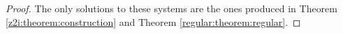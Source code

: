 \begin{proof}
    The only solutions to these systems are the ones produced in Theorem \ref{z2i:theorem:construction} and Theorem \ref{regular:theorem:regular}.
\end{proof}


% 
%     
